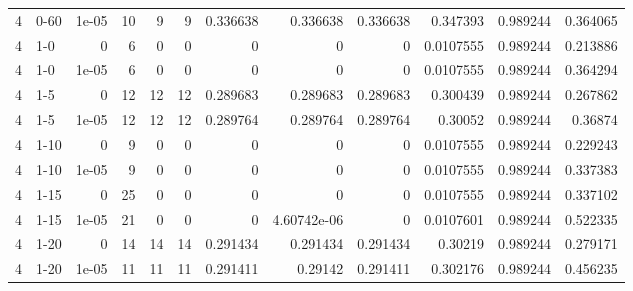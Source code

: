 \begin{tabular}{rlrrrrrrrrrr}
     4 & 0-60   &      1e-05 &          10 &                 9 &                 9 &     0.336638    &     0.336638    &      0.336638    &        0.347393  &               0.989244 &           0.364065 \\
     4 & 1-0    &      0     &           6 &                 0 &                 0 &     0           &     0           &      0           &        0.0107555 &               0.989244 &           0.213886 \\
     4 & 1-0    &      1e-05 &           6 &                 0 &                 0 &     0           &     0           &      0           &        0.0107555 &               0.989244 &           0.364294 \\
     4 & 1-5    &      0     &          12 &                12 &                12 &     0.289683    &     0.289683    &      0.289683    &        0.300439  &               0.989244 &           0.267862 \\
     4 & 1-5    &      1e-05 &          12 &                12 &                12 &     0.289764    &     0.289764    &      0.289764    &        0.30052   &               0.989244 &           0.36874  \\
     4 & 1-10   &      0     &           9 &                 0 &                 0 &     0           &     0           &      0           &        0.0107555 &               0.989244 &           0.229243 \\
     4 & 1-10   &      1e-05 &           9 &                 0 &                 0 &     0           &     0           &      0           &        0.0107555 &               0.989244 &           0.337383 \\
     4 & 1-15   &      0     &          25 &                 0 &                 0 &     0           &     0           &      0           &        0.0107555 &               0.989244 &           0.337102 \\
     4 & 1-15   &      1e-05 &          21 &                 0 &                 0 &     0           &     4.60742e-06 &      0           &        0.0107601 &               0.989244 &           0.522335 \\
     4 & 1-20   &      0     &          14 &                14 &                14 &     0.291434    &     0.291434    &      0.291434    &        0.30219   &               0.989244 &           0.279171 \\
     4 & 1-20   &      1e-05 &          11 &                11 &                11 &     0.291411    &     0.29142     &      0.291411    &        0.302176  &               0.989244 &           0.456235 \\

\end{tabular}
